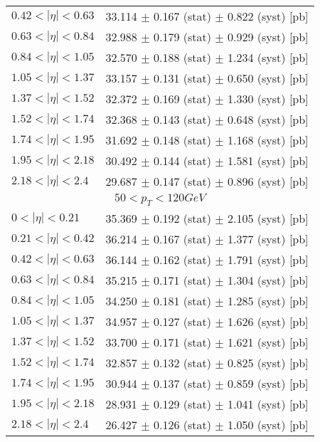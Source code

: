 \begin{tabular}{lc}
$0.42 < |\eta| <0.63$          & 33.114 $\pm$ 0.167 (stat) $\pm$ 0.822 (syst) [pb]  \\
$0.63 < |\eta| <0.84$          & 32.988 $\pm$ 0.179 (stat) $\pm$ 0.929 (syst) [pb]  \\
$0.84 < |\eta| <1.05$          & 32.570 $\pm$ 0.188 (stat) $\pm$ 1.234 (syst) [pb]  \\
$1.05 < |\eta| <1.37$          & 33.157 $\pm$ 0.131 (stat) $\pm$ 0.650 (syst) [pb]  \\
$1.37 < |\eta| <1.52$          & 32.372 $\pm$ 0.169 (stat) $\pm$ 1.330 (syst) [pb]  \\
$1.52 < |\eta| <1.74$          & 32.368 $\pm$ 0.143 (stat) $\pm$ 0.648 (syst) [pb]  \\
$1.74 < |\eta| <1.95$          & 31.692 $\pm$ 0.148 (stat) $\pm$ 1.168 (syst) [pb]  \\
$1.95 < |\eta| <2.18$          & 30.492 $\pm$ 0.144 (stat) $\pm$ 1.581 (syst) [pb]  \\
$2.18 < |\eta| <2.4$           & 29.687 $\pm$ 0.147 (stat) $\pm$ 0.896 (syst) [pb]  \\
\hline
\multicolumn{2}{c}{$50 < p_{T} < 120 GeV$} \\
\hline
$0 < |\eta| <0.21$             & 35.369 $\pm$ 0.192 (stat) $\pm$ 2.105 (syst) [pb]  \\
$0.21 < |\eta| <0.42$          & 36.214 $\pm$ 0.167 (stat) $\pm$ 1.377 (syst) [pb]  \\
$0.42 < |\eta| <0.63$          & 36.144 $\pm$ 0.162 (stat) $\pm$ 1.791 (syst) [pb]  \\
$0.63 < |\eta| <0.84$          & 35.215 $\pm$ 0.171 (stat) $\pm$ 1.304 (syst) [pb]  \\
$0.84 < |\eta| <1.05$          & 34.250 $\pm$ 0.181 (stat) $\pm$ 1.285 (syst) [pb]  \\
$1.05 < |\eta| <1.37$          & 34.957 $\pm$ 0.127 (stat) $\pm$ 1.626 (syst) [pb]  \\
$1.37 < |\eta| <1.52$          & 33.700 $\pm$ 0.171 (stat) $\pm$ 1.621 (syst) [pb]  \\
$1.52 < |\eta| <1.74$          & 32.857 $\pm$ 0.132 (stat) $\pm$ 0.825 (syst) [pb]  \\
$1.74 < |\eta| <1.95$          & 30.944 $\pm$ 0.137 (stat) $\pm$ 0.859 (syst) [pb]  \\
$1.95 < |\eta| <2.18$          & 28.931 $\pm$ 0.129 (stat) $\pm$ 1.041 (syst) [pb]  \\
$2.18 < |\eta| <2.4$           & 26.427 $\pm$ 0.126 (stat) $\pm$ 1.050 (syst) [pb]  \\
\hline
\hline
\end{tabular}
